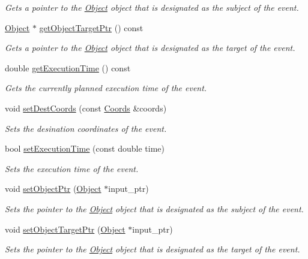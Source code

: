 \begin{DoxyCompactItemize}
\begin{DoxyCompactList}\small\item\em Gets a pointer to the \hyperlink{class_object}{Object} object that is designated as the subject of the event. \end{DoxyCompactList}\item 
\hyperlink{class_object}{Object} $\ast$ \hyperlink{class_event_ab86f724c3c894faa1d6ccca78c357d24}{get\+Object\+Target\+Ptr} () const
\begin{DoxyCompactList}\small\item\em Gets a pointer to the \hyperlink{class_object}{Object} object that is designated as the target of the event. \end{DoxyCompactList}\item 
double \hyperlink{class_event_a65550d982cdf85d993658cd7070c960c}{get\+Execution\+Time} () const
\begin{DoxyCompactList}\small\item\em Gets the currently planned execution time of the event. \end{DoxyCompactList}\item 
void \hyperlink{class_event_a166ae40f2bf26c1e08097697ca76c884}{set\+Dest\+Coords} (const \hyperlink{struct_coords}{Coords} \&coords)
\begin{DoxyCompactList}\small\item\em Sets the desination coordinates of the event. \end{DoxyCompactList}\item 
bool \hyperlink{class_event_af4282af20bd5b3940ba75c23e6032f18}{set\+Execution\+Time} (const double time)
\begin{DoxyCompactList}\small\item\em Sets the execution time of the event. \end{DoxyCompactList}\item 
void \hyperlink{class_event_a078cadde679fc042486ef065a097c7af}{set\+Object\+Ptr} (\hyperlink{class_object}{Object} $\ast$input\+\_\+ptr)
\begin{DoxyCompactList}\small\item\em Sets the pointer to the \hyperlink{class_object}{Object} object that is designated as the subject of the event. \end{DoxyCompactList}\item 
void \hyperlink{class_event_a2e868dc951b6fec86703dcd7776680e0}{set\+Object\+Target\+Ptr} (\hyperlink{class_object}{Object} $\ast$input\+\_\+ptr)
\begin{DoxyCompactList}\small\item\em Sets the pointer to the \hyperlink{class_object}{Object} object that is designated as the target of the event. \end{DoxyCompactList}\end{DoxyCompactItemize}



